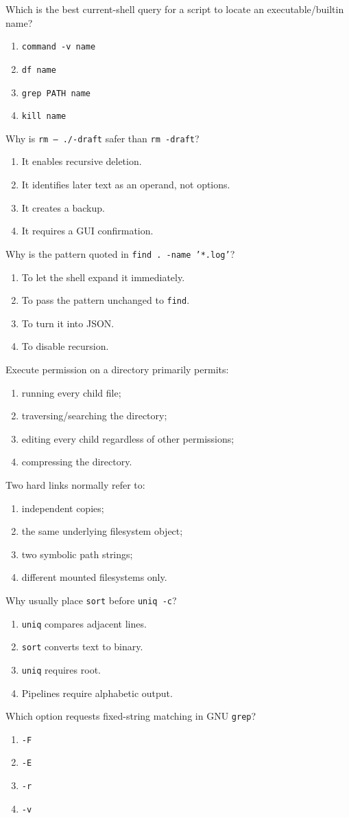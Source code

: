 \documentclass[11pt,oneside,openany]{book}
\newcommand{\fourchoices}[4]{%
  \begin{enumerate}[label=\Alph*),leftmargin=2em,itemsep=0.25em]
    \item #1
    \item #2
    \item #3
    \item #4
  \end{enumerate}}
\begin{document}
\begin{questionbox}[title={Medium 4 -- Name discovery}]
Which is the best current-shell query for a script to locate an executable/builtin name?
\fourchoices{\texttt{command -v name}}{\texttt{df name}}{\texttt{grep PATH name}}{\texttt{kill name}}
\end{questionbox}

\begin{questionbox}[title={Medium 5 -- Option termination}]
Why is \texttt{rm -- ./-draft} safer than \texttt{rm -draft}?
\fourchoices{It enables recursive deletion.}{It identifies later text as an operand, not options.}{It creates a backup.}{It requires a GUI confirmation.}
\end{questionbox}

\begin{questionbox}[title={Medium 6 -- \texttt{find} patterns}]
Why is the pattern quoted in \texttt{find . -name '*.log'}?
\fourchoices{To let the shell expand it immediately.}{To pass the pattern unchanged to \texttt{find}.}{To turn it into JSON.}{To disable recursion.}
\end{questionbox}

\begin{questionbox}[title={Medium 7 -- Directory execute}]
Execute permission on a directory primarily permits:
\fourchoices{running every child file;}{traversing/searching the directory;}{editing every child regardless of other permissions;}{compressing the directory.}
\end{questionbox}

\begin{questionbox}[title={Medium 8 -- Hard links}]
Two hard links normally refer to:
\fourchoices{independent copies;}{the same underlying filesystem object;}{two symbolic path strings;}{different mounted filesystems only.}
\end{questionbox}

\begin{questionbox}[title={Medium 9 -- Counting duplicates}]
Why usually place \texttt{sort} before \texttt{uniq -c}?
\fourchoices{\texttt{uniq} compares adjacent lines.}{\texttt{sort} converts text to binary.}{\texttt{uniq} requires root.}{Pipelines require alphabetic output.}
\end{questionbox}

\begin{questionbox}[title={Medium 10 -- Literal selection}]
Which option requests fixed-string matching in GNU \texttt{grep}?
\fourchoices{\texttt{-F}}{\texttt{-E}}{\texttt{-r}}{\texttt{-v}}
\end{questionbox}
\end{document}
